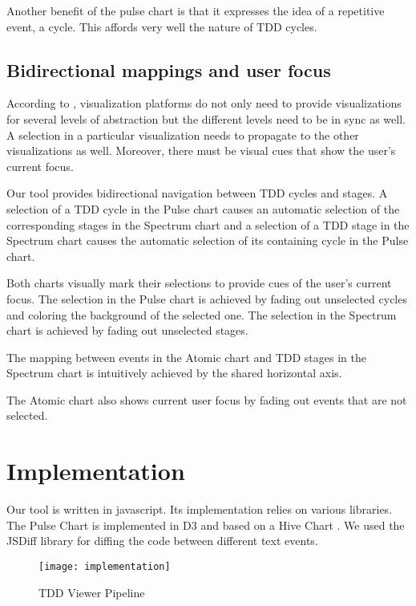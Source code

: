 \documentclass[journal]{vgtc}                %
\begin{document}
Another benefit of the pulse chart is that it expresses the idea of a repetitive event, a cycle.
This affords very well the nature of TDD cycles.

\subsection{Bidirectional mappings and user focus}

According to \cite{two}, visualization platforms do not only need to provide visualizations for several levels of abstraction but the different levels need to be in sync as well.
A selection in a particular visualization needs to propagate to the other visualizations as well.
Moreover, there must be visual cues that show the user's current focus.

Our tool provides bidirectional navigation between TDD cycles and stages.
A selection of a TDD cycle in the Pulse chart causes an automatic selection of the corresponding stages in the Spectrum chart and a selection of a TDD stage in the Spectrum chart causes the automatic selection of its containing cycle in the Pulse chart.

Both charts visually mark their selections to provide cues of the user's current focus.
The selection in the Pulse chart is achieved by fading out unselected cycles and coloring the background of the selected one.
The selection in the Spectrum chart is achieved by fading out unselected stages.

The mapping between events in the Atomic chart and TDD stages in the Spectrum chart is intuitively achieved by the shared horizontal axis.

The Atomic chart also shows current user focus by fading out events that are not selected.
\section{Implementation}

Our tool is written in javascript.
Its implementation relies on various libraries.
The Pulse Chart is implemented in D3 \cite{three} and based on a Hive Chart \cite{four}.
We used the JSDiff library \cite{five} for diffing the code between different text events.

\begin{figure}
	\texttt{[image: implementation]}
	\caption{TDD Viewer Pipeline}
	\label{fig:tool_pipeline}
\end{figure}
\end{document}
